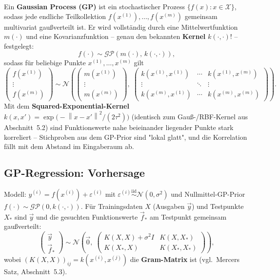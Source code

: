\documentclass[11pt]{article}
\theoremstyle{csthm}
\theoremstyle{csdef}
\newcommand{\N}{\mathcal{N}}
\newcommand{\X}{\mathcal{X}}
\newcommand{\norm}[1]{\left\|#1\right\|}
\begin{document}
Ein \textbf{Gaussian Process (GP)} ist ein stochastischer Prozess
$\{f(x) : x\in\X\}$, sodass jede endliche Teilkollektion
$f(x^{(1)}),\ldots,f(x^{(m)})$ gemeinsam multivariat gaußverteilt ist. Er
wird vollständig durch eine Mittelwertfunktion $m(\cdot)$ und eine
Kovarianzfunktion -- genau den bekannten \textbf{Kernel} $k(\cdot,\cdot)$! --
festgelegt:
\begin{equation}
  f(\cdot) \sim \mathcal{GP}(m(\cdot),\,k(\cdot,\cdot)),
\end{equation}
sodass für beliebige Punkte $x^{(1)},\ldots,x^{(m)}$ gilt
\begin{equation}
  \begin{pmatrix} f(x^{(1)}) \\ \vdots \\ f(x^{(m)}) \end{pmatrix}
  \sim \N\!\left(
    \begin{pmatrix} m(x^{(1)}) \\ \vdots \\ m(x^{(m)}) \end{pmatrix},\;
    \begin{pmatrix}
      k(x^{(1)},x^{(1)}) & \cdots & k(x^{(1)},x^{(m)}) \\
      \vdots & \ddots & \vdots \\
      k(x^{(m)},x^{(1)}) & \cdots & k(x^{(m)},x^{(m)})
    \end{pmatrix}
  \right).
\end{equation}
Mit dem \textbf{Squared-Exponential-Kernel}
$k(x,x') = \exp\bigl(-\norm{x-x'}^2/(2\tau^2)\bigr)$ (identisch zum
Gauß-/RBF-Kernel aus Abschnitt~5.2) sind Funktionswerte nahe beieinander
liegender Punkte stark korreliert -- Stichproben aus dem GP-Prior sind
"lokal glatt", und die Korrelation fällt mit dem Abstand im Eingaberaum ab.

\subsection{GP-Regression: Vorhersage}

Modell: $y^{(i)} = f(x^{(i)}) + \varepsilon^{(i)}$ mit
$\varepsilon^{(i)} \overset{\text{iid}}{\sim} \N(0,\sigma^2)$ und
Nullmittel-GP-Prior $f(\cdot)\sim\mathcal{GP}(0,k(\cdot,\cdot))$. Für
Trainingsdaten $X$ (Ausgaben $\vec y$) und Testpunkte $X_*$ sind $\vec y$ und
die gesuchten Funktionswerte $\vec f_*$ am Testpunkt gemeinsam gaußverteilt:
\begin{equation}
  \begin{pmatrix}\vec y \\ \vec f_*\end{pmatrix}
  \sim \N\!\left(\vec 0,\;
    \begin{pmatrix} K(X,X)+\sigma^2 I & K(X,X_*) \\ K(X_*,X) & K(X_*,X_*)\end{pmatrix}
  \right),
\end{equation}
wobei $(K(X,X))_{ij} = k(x^{(i)},x^{(j)})$ die \textbf{Gram-Matrix} ist
(vgl.\ Mercers Satz, Abschnitt~5.3).
\end{document}
